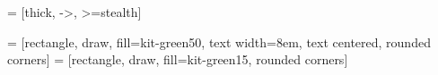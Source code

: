 \newenvironment{alist}{
  \begin{list}{(\alph{abc})}{
      \usecounter{abc}\setlength{\leftmargin}{8mm}\setlength{\labelsep}{2mm}
    }
}{\end{list}}

\newcommand{\nM}{\mathbb}
\newcommand{\nR}{\mathbb{R}}
\newcommand{\nN}{\mathbb{N}}
\newcommand{\nZ}{\mathbb{Z}}
\newcommand{\nQ}{\mathbb{Q}}
\newcommand{\nC}{\mathbb{C}}
\newcommand{\nK}{\mathbb{K}}
\newcommand{\nF}{\mathbb{F}}
\newcommand{\nullel}{\mathcal{O}}
\newcommand{\einsel}{\mathds{1}}

\newcommand{\summe}[2]{\sum\limits_{#1}^{#2}}

\newcommand{\coss}[1]{\cos\left( #1 \right)}
\newcommand{\sinn}[1]{\sin\left( #1 \right)}
\newcommand{\psumme}{\sum\limits_{n=0}^{\infty}}


\newcommand{\limesn}{\lim\limits_{n\to\infty}}
\newcommand{\limesx}{\lim\limits_{x\to\infty}}
\newcommand{\limesp}[1]{\lim\limits_{#1\to\infty}}
\newcommand{\limespfeil}[1]{\xrightarrow[#1\to\infty]{}}
\newcommand{\limesto}[2]{\lim\limits_{#1 \to #2}}
\newcommand{\limes}[1]{\lim\limits_{#1}}
\newcommand{\limespfeilto}[1]{\xrightarrow[#1]{}}
\newcommand{\limesw}[1]{\xrightarrow[#1]{W}}





\newcommand{\dd}[2]{\frac{\mathrm d#1}{\mathrm d#2}}
\newcommand{\pp}[2]{\frac{\partial#1}{\partial#2}}
\newcommand{\ddx}{\frac{\mathrm d}{\mathrm dx}}
\newcommand{\ddt}[1]{\frac{\mathrm d #1}{\mathrm dt}}
\newcommand{\ddn}[2]{\frac{\mathrm{d}^{#2}}{\mathrm{d}#1^{#2}}}
\newcommand{\ddxn}[1]{\frac{\mathrm{d}^{#1}}{\mathrm{d} x^{#1}}}
\newcommand{\bint}[2]{\int\limits_{#1}^{#2}}
\newcommand{\aint}[1]{\int\limits_{#1}^{}}
\newcommand{\intd}{\ \mathrm d}
\renewcommand{\div}{\text{div }}
\newcommand{\rot}{\text{rot }}

\newcommand{\diag}[1]{\mathrm{diag}\left(#1\right)}

\newcommand{\LL}{\mathcal{L}}

\newcommand{\grad}{\text{grad} \ }

 = [thick, ->, >=stealth]

 = [rectangle, draw, fill=kit-green50, 
      text width=8em, text centered, rounded corners]
 = [rectangle, draw, fill=kit-green15, rounded corners]
      
